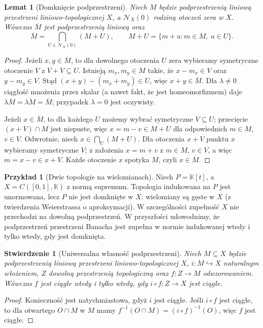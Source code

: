 \documentclass[11pt,a4paper]{article}
\numberwithin{equation}{section}
\theoremstyle{plain}
\newtheorem{stwierdzenie}[twierdzenie]{Stwierdzenie}
\newtheorem{lemat}[twierdzenie]{Lemat}
\theoremstyle{definition}
\newtheorem{przyklad}[twierdzenie]{Przykład}
\theoremstyle{remark}
\newcommand{\K}{\mathbb K}
\begin{document}
\begin{lemat}[Domknięcie podprzestrzeni]\label{lem:closure-subspace}
Niech $M$ będzie podprzestrzenią liniową przestrzeni
liniowo-topologicznej $X$, a $\mathcal N_X(0)$ rodziną
otoczeń zera w $X$. Wówczas $\overline M$ jest podprzestrzenią
liniową oraz
\[
 \overline M=\bigcap_{U\in\mathcal N_X(0)}(M+U),
 \qquad M+U=\{m+u:m\in M,\ u\in U\}.
\]
\end{lemat}
\begin{proof}
Jeżeli $x,y\in\overline M$, to dla dowolnego otoczenia $U$
zera wybieramy symetryczne otoczenie $V$ z $V+V\subseteq U$.
Istnieją $m_x,m_y\in M$ takie, że $x-m_x\in V$ oraz
$y-m_y\in V$. Stąd $(x+y)-(m_x+m_y)\in U$,
więc $x+y\in\overline M$. Dla $\lambda\ne0$ ciągłość
mnożenia przez skalar (a nawet fakt, że jest homeomorfizmem)
daje $\lambda\overline M=\overline{\lambda M}=\overline M$;
przypadek $\lambda=0$ jest oczywisty.

Jeżeli $x\in\overline M$, to dla każdego $U$ możemy wybrać
symetryczne $V\subseteq U$; przecięcie $(x+V)\cap M$
jest niepuste, więc $x=m-v\in M+U$ dla odpowiednich
$m\in M$, $v\in V$. Odwrotnie, niech $x\in\bigcap_U(M+U)$.
Dla otoczenia $x+V$ punktu $x$ wybieramy symetryczne $V$;
z założenia $x=m+v$ z $m\in M$, $v\in V$,
a więc $m=x-v\in x+V$. Każde otoczenie $x$ spotyka $M$,
czyli $x\in\overline M$.
\end{proof}

\begin{przyklad}[Dwie topologie na wielomianach]
Niech $P=\K[t]$, a $X=C([0,1],\K)$ z normą supremum.
Topologia indukowana na $P$ jest unormowana, lecz $P$
nie jest domknięte w $X$: wielomiany są gęste w $X$
(z twierdzenia Weierstrassa o aproksymacji). W szczególności
zupełność $X$ nie przechodzi na dowolną podprzestrzeń.
W przyszłości udowodnimy, że podprzestrzeń przestrzeni Banacha
jest zupełna w normie indukowanej wtedy i tylko wtedy, gdy
jest domknięta.
\end{przyklad}

\begin{stwierdzenie}[Uniwersalna własność podprzestrzeni]
Niech $M\subseteq X$ będzie podprzestrzenią liniową przestrzeni
liniowo-topologicznej $X$, $i:M\hookrightarrow X$ naturalnym
włożeniem, $Z$ dowolną przestrzenią topologiczną oraz
$f:Z\to M$ odwzorowaniem. Wówczas $f$ jest ciągłe
wtedy i tylko wtedy, gdy $i\circ f:Z\to X$ jest ciągłe.
\end{stwierdzenie}
\begin{proof}
Konieczność jest natychmiastowa, gdyż $i$ jest ciągłe.
Jeśli $i\circ f$ jest ciągłe, to dla otwartego $O\cap M$
w $M$ mamy $f^{-1}(O\cap M)=(i\circ f)^{-1}(O)$,
więc $f$ jest ciągłe.
\end{proof}
\end{document}
